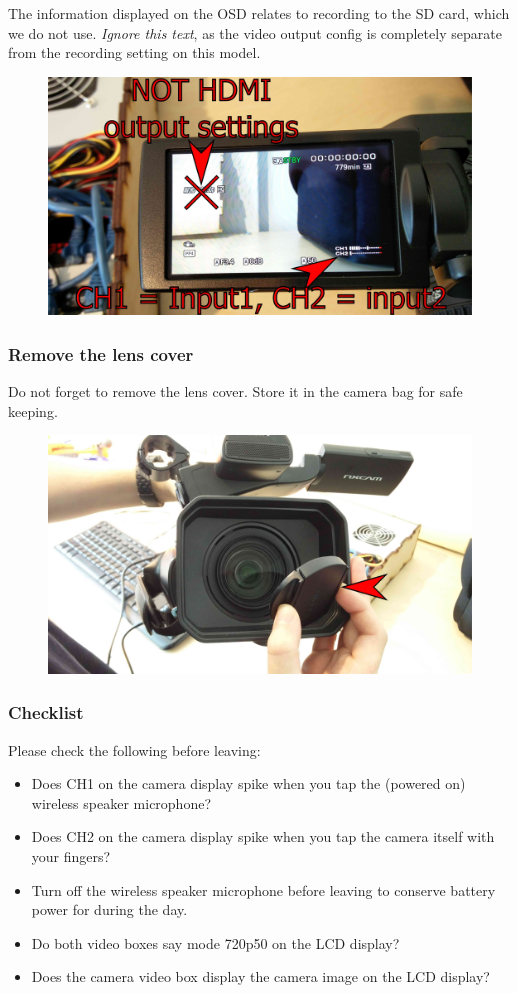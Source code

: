 \documentclass{article}
\begin{document}
The information displayed on the OSD relates to recording to the SD card, which we do not use. \emph{Ignore this text}, as the video output config is completely separate from the recording setting on this model.
\begin{figure}[H]
  \centering
\includegraphics[width = 120mm]{Sony06.jpg}
\end{figure}

\subsubsection{Remove the lens cover}
Do not forget to remove the lens cover. Store it in the camera bag for safe keeping.

\begin{figure}[H]
  \centering
\includegraphics[width = 120mm]{Sony07.jpg}
\end{figure}

\subsubsection{Checklist}
Please check the following before leaving:
\begin{itemize}
  \item Does CH1 on the camera display spike when you tap the (powered on) wireless speaker microphone?
  \item Does CH2 on the camera display spike when you tap the camera itself with your fingers?
  \item Turn off the wireless speaker microphone before leaving to conserve battery power for during the day.
  \item Do both video boxes say mode 720p50 on the LCD display?
  \item Does the camera video box display the camera image on the LCD display?
\end{itemize}
\end{document}
